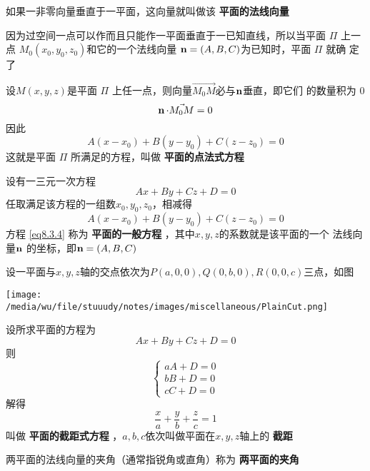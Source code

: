 \documentclass[11pt]{article}
\begin{document}
如果一非零向量垂直于一平面，这向量就叫做该 \textbf{平面的法线向量}

因为过空间一点可以作而且只能作一平面垂直于一已知直线，所以当平面 \(\Pi\) 上一点
\(M_0(x_0,y_0,z_0)\)和它的一个法线向量 \(\operatorname{\textbf{n}}=(A,B, C)\)为已知时，平面 \(\Pi\) 就确
定了

设\(M(x,y,z)\)是平面 \(\Pi\) 上任一点，则向量\(\vec{M_0M}\)必与\(\operatorname{\textbf{n}}\)垂直，即它们
的数量积为 0
\begin{equation*}
\operatorname{\textbf{n}}\cdot\vec{M_0M}=0
\end{equation*}
因此
\begin{equation*}
A(x-x_0)+B(y-y_0)+C(z-z_0)=0
\end{equation*}
这就是平面 \(\Pi\) 所满足的方程，叫做 \textbf{平面的点法式方程}

设有一三元一次方程
\begin{equation}
Ax+By+Cz+D=0\label{eq8.3.4}
\end{equation}
任取满足该方程的一组数\(x_0,y_0,z_0\)，相减得
\begin{equation}
A(x-x_0)+B(y-y_0)+C(z-z_0)=0\label{eq8.3.6}
\end{equation}
方程 \eqref{eq8.3.4} 称为 \textbf{平面的一般方程} ，其中\(x,y,z\)的系数就是该平面的一个
法线向量\(\operatorname{\textbf{n}}\) 的坐标，即\(\operatorname{\textbf{n}}=(A,B,C)\)

\begin{examplle}[]
设一平面与\(x,y,z\)轴的交点依次为\(P(a,0,0),Q(0,b,0),R(0,0,c)\)三点，如图

\begin{center}
\texttt{[image: /media/wu/file/stuuudy/notes/images/miscellaneous/PlainCut.png]}
\end{center}
设所求平面的方程为
\begin{equation*}
Ax+By+Cz+D=0
\end{equation*}
则
\begin{equation*}
\begin{cases}
aA+D=0\\bB+D=0\\cC+D=0
\end{cases}
\end{equation*}
解得
\begin{equation*}
\frac{x}{a}+\frac{y}{b}+\frac{z}{c}=1
\end{equation*}
叫做 \textbf{平面的截距式方程} ，\(a,b,c\)依次叫做平面在\(x,y,z\)轴上的 \textbf{截距}
\end{examplle}


两平面的法线向量的夹角（通常指锐角或直角）称为 \textbf{两平面的夹角}
\end{document}
